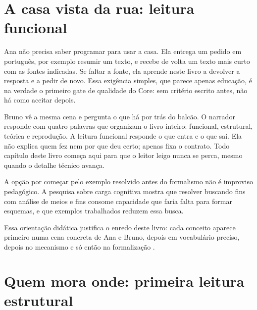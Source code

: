 \section{A casa vista da rua: leitura funcional}

Ana n\~ao precisa saber programar para usar a casa. Ela entrega um pedido em portugu\^es, por exemplo resumir um texto, e recebe de volta um texto mais curto com as fontes indicadas. Se faltar a fonte, ela aprende neste livro a devolver a resposta e a pedir de novo. Essa exig\^encia simples, que parece apenas educa\c{c}\~ao, \'e na verdade o primeiro gate de qualidade do Core: sem crit\'erio escrito antes, n\~ao h\'a como aceitar depois.

Bruno v\^e a mesma cena e pergunta o que h\'a por tr\'as do balc\~ao. O narrador responde com quatro palavras que organizam o livro inteiro: funcional, estrutural, te\'orica e reprodu\c{c}\~ao. A leitura funcional responde o que entra e o que sai. Ela n\~ao explica quem fez nem por que deu certo; apenas fixa o contrato. Todo cap\'itulo deste livro come\c{c}a aqui para que o leitor leigo nunca se perca, mesmo quando o detalhe t\'ecnico avan\c{c}a.

A op\c{c}\~ao por come\c{c}ar pelo exemplo resolvido antes do formalismo n\~ao \'e improviso pedag\'ogico. A pesquisa sobre carga cognitiva mostra que resolver buscando fins com an\'alise de meios e fins consome capacidade que faria falta para formar esquemas, e que exemplos trabalhados reduzem essa busca.

Essa orienta\c{c}\~ao did\'atica justifica o enredo deste livro: cada conceito aparece primeiro numa cena concreta de Ana e Bruno, depois em vocabul\'ario preciso, depois no mecanismo e s\'o ent\~ao na formaliza\c{c}\~ao .

\section{Quem mora onde: primeira leitura estrutural}

